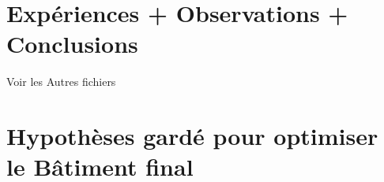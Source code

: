 \documentclass[12pt]{article}
\begin{document}
\section{Expériences + Observations + Conclusions}

Voir les Autres fichiers

\section{Hypothèses gardé pour optimiser le Bâtiment final}
\end{document}
